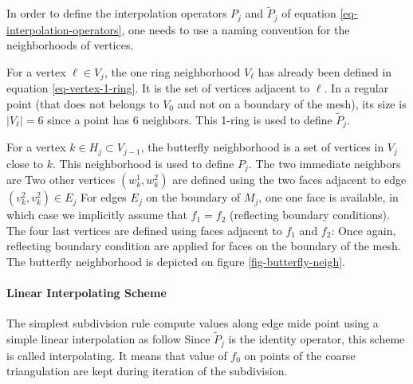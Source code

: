 In order to define the interpolation operators $P_j$ and $\tilde P_j$ of equation \eqref{eq-interpolation-operators}, one needs to use a naming convention for the neighborhoods of vertices. 

For a vertex $\ell \in V_j$, the one ring neighborhood $V_\ell$ has already been defined in equation \eqref{eq-vertex-1-ring}. It is the set of vertices adjacent to $\ell$. In a regular point (that does not belongs to $V_0$ and not on a boundary of the mesh), its size is $|V_\ell|=6$ since a point has $6$ neighbors. This 1-ring is used to define $\tilde P_j$.

For a vertex $k \in H_j \subset V_{j-1}$, the butterfly neighborhood is a set of vertices in $V_j$ close to $k$. This neighborhood is used to define $P_j$. The two immediate neighbors are
Two other vertices $(w_k^1,w_k^2)$ are defined using the two faces adjacent to edge $(v_k^2,v_k^2) \in E_j$
For edges $E_j$ on the boundary of $M_j$, one one face is available, in which case we implicitly assume that $f_1=f_2$ (reflecting boundary conditions). The four last vertices are defined using faces adjacent to $f_1$ and $f_2$:
Once again, reflecting boundary condition are applied for faces on the boundary of the mesh. The butterfly neighborhood is depicted on figure \ref{fig-butterfly-neigh}.


\paragraph{Linear Interpolating Scheme}

The simplest subdivision rule compute values along edge mide point using a simple linear interpolation as follow
Since $\tilde P_j$ is the identity operator, this scheme is called interpolating. It means that value of $f_0$ on points of the coarse triangulation are kept during iteration of the subdivision.

